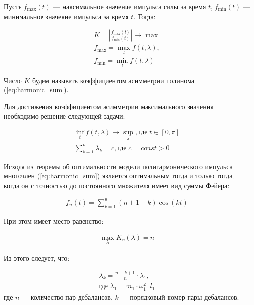 Пусть $f_{\max}(t)$ --- максимальное значение импульса силы за время $t$, $f_{\min}(t)$ --- минимальное значение импульса за время $t$. Тогда:

\begin{equation}\label{eq:optim}
    \begin{gathered}
        K = \left| \frac{f_{\max}(t)}{f_{\min}(t)} \right| \rightarrow \max \\
        f_{\max} = \max_t f(t, \lambda),\\
        f_{\min} = \min_t f(t, \lambda)
    \end{gathered}
\end{equation}

Число $K$ будем называть коэффициентом асимметрии полинома (\ref{eq:harmonic_sum}).

Для достижения коэффициентом асимметрии максимального значения необходимо решение следующей задачи:

\begin{equation}\label{eq:math_task}
    \begin{gathered}
        \inf_t f(t, \lambda) \rightarrow \sup_\lambda, \textrm{где } t \in [0, \pi]\\
        \sum\limits_{k = 1}^n \lambda_k = c, \textrm{где } c = const > 0
    \end{gathered}
\end{equation}

Исходя из теоремы об оптимальности модели полигармонического импульса \cite{kostin_article}
многочлен (\ref{eq:harmonic_sum}) является оптимальным тогда и только тогда, когда он с точностью до постоянного множителя имеет вид суммы Фейера:

\begin{equation}\label{eq:feer}
    \begin{gathered}
        f_n(t) = \sum\limits_{k = 1}^n (n + 1 - k) \cos(kt)
    \end{gathered}
\end{equation}

При этом имеет место равенство:

\begin{equation}\label{eq:max_lambda}
    \begin{gathered}
        \max \limits_{\lambda} K_n(\lambda) = n
    \end{gathered}
\end{equation}

Из этого следует, что:

\begin{equation}\label{eq:opt_attitude}
    \begin{gathered}
        \lambda_k = \frac{n - k + 1}{n} \cdot \lambda_1,\\
        \textrm{где } \lambda_1 = m_1 \cdot \omega_{1}^{2} \cdot l_1
    \end{gathered}
\end{equation}
\noindent где $n$ --- количество пар дебалансов, $k$ --- порядковый номер пары дебалансов.

